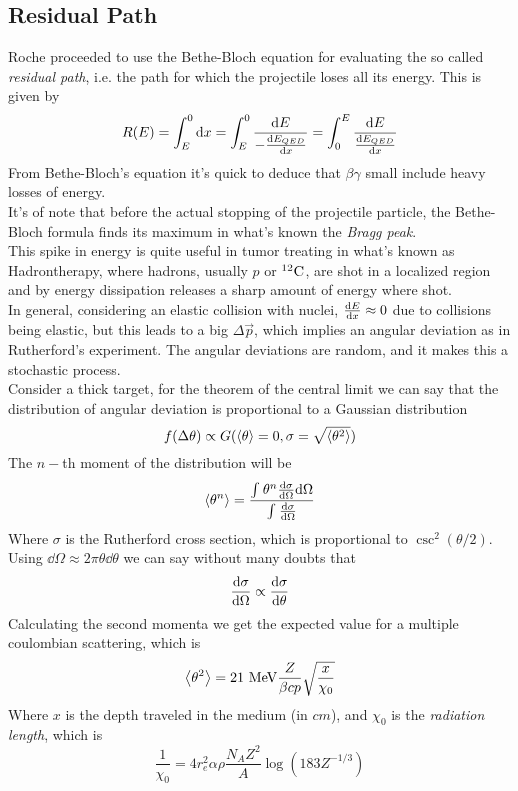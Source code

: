 \documentclass[../qm.tex]{subfiles}
\begin{document}
\subsection{Residual Path}
Roche proceeded to use the Bethe-Bloch equation for evaluating the so called \emph{residual path}, i.e. the path for which the projectile loses all its energy. This is given by
\begin{equation}
	R(E)=\int_{E}^{0}\dd x=\int_{E}^{0}\frac{\dd E}{-\dv{E_{QED}}{x}}=\int_{0}^{E}\frac{\dd E}{\dv{E_{QED}}{x}}
	\label{eq:rochepath}
\end{equation}
From Bethe-Bloch's equation it's quick to deduce that $\beta\gamma$ small include heavy losses of energy.\\
It's of note that before the actual stopping of the projectile particle, the Bethe-Bloch formula finds its maximum in what's known the \emph{Bragg peak}.\\
This spike in energy is quite useful in tumor treating in what's known as Hadrontherapy, where hadrons, usually $p$ or $\nuc{C}{12}{}$, are shot in a localized region and by energy dissipation releases a sharp amount of energy where shot.\\
In general, considering an elastic collision with nuclei, $\dv{E}{x}\approx0$ due to collisions being elastic, but this leads to a big $\Delta\vec{p}$, which implies an angular deviation as in Rutherford's experiment. The angular deviations are random, and it makes this a stochastic process.\\
Consider a thick target, for the theorem of the central limit we can say that the distribution of angular deviation is proportional to a Gaussian distribution
\begin{equation*}
	f(\Delta\theta)\propto G(\expval{\theta}=0,\sigma=\sqrt{\expval{\theta^2}})
\end{equation*}
The $n-$th moment of the distribution will be
\begin{equation*}
	\expval{\theta^n}=\frac{\int_{}^{}\theta^n\dv{\sigma}{\Omega}\dd\Omega}{\int_{}^{}\dv{\sigma}{\Omega}}
\end{equation*}
Where $\sigma$ is the Rutherford cross section, which is proportional to $\csc^2(\theta/2)$. Using $\dd\Omega\approx2\pi\theta\dd\theta$ we can say without many doubts that
\begin{equation*}
	\dv{\sigma}{\Omega}\propto\dv{\sigma}{\theta}
\end{equation*}
Calculating the second momenta we get the expected value for a multiple coulombian scattering, which is
\begin{equation*}
	\expval{\theta^2}=21\unit{MeV}\frac{Z}{\beta cp}\sqrt{\frac{x}{\chi_0}}
\end{equation*}
Where $x$ is the depth traveled in the medium (in $\unit{cm}$), and $\chi_0$ is the \emph{radiation length}, which is
\begin{equation}
	\frac{1}{\chi_0}=4r_e^2\alpha\rho\frac{N_AZ^2}{A}\log\left( 183Z^{-1/3} \right)
	\label{eq:radlength}
\end{equation}
\end{document}
